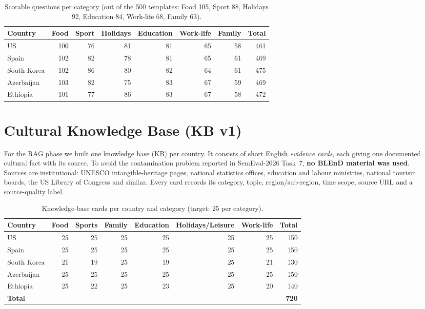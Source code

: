 \documentclass[11pt]{article}
\begin{document}
\begin{table}[h]
\centering
\caption{Scorable questions per category (out of the 500 templates: Food 105, Sport 88, Holidays 92,
Education 84, Work-life 68, Family 63).}
\label{tab:cats}
\begin{tabular}{lrrrrrrr}
\toprule
Country & Food & Sport & Holidays & Education & Work-life & Family & Total \\
\midrule
US          & 100 & 76 & 81 & 81 & 65 & 58 & 461 \\
Spain       & 102 & 82 & 78 & 81 & 65 & 61 & 469 \\
South Korea & 102 & 86 & 80 & 82 & 64 & 61 & 475 \\
Azerbaijan  & 103 & 82 & 75 & 83 & 67 & 59 & 469 \\
Ethiopia    & 101 & 77 & 86 & 83 & 67 & 58 & 472 \\
\bottomrule
\end{tabular}
\end{table}

\section{Cultural Knowledge Base (KB v1)}
For the RAG phase we built one knowledge base (KB) per country. It consists of short English
\emph{evidence cards}, each giving one documented cultural fact with its source. To avoid the
contamination problem reported in SemEval-2026 Task~7, \textbf{no BLEnD material was used}. Sources
are institutional: UNESCO intangible-heritage pages, national statistics offices, education and
labour ministries, national tourism boards, the US Library of Congress and similar. Every card records
its category, topic, region/sub-region, time scope, source URL and a source-quality label.

\begin{table}[h]
\centering
\caption{Knowledge-base cards per country and category (target: 25 per category).}
\label{tab:kb}
\begin{tabular}{lrrrrrrr}
\toprule
Country & Food & Sports & Family & Education & Holidays/Leisure & Work-life & Total \\
\midrule
US          & 25 & 25 & 25 & 25 & 25 & 25 & 150 \\
Spain       & 25 & 25 & 25 & 25 & 25 & 25 & 150 \\
South Korea & 21 & 19 & 25 & 19 & 25 & 21 & 130 \\
Azerbaijan  & 25 & 25 & 25 & 25 & 25 & 25 & 150 \\
Ethiopia    & 25 & 22 & 25 & 23 & 25 & 20 & 140 \\
\midrule
\textbf{Total} & & & & & & & \textbf{720} \\
\bottomrule
\end{tabular}
\end{table}
\end{document}
